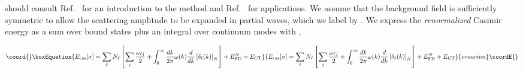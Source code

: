 \documentclass[a4paper,aps,amsfonts,prl,showpacs,nobibnotes,nofootinbib,%
tightenlines,twocolumn]{revtex4}
\providecommand{\vek}[1]{\mathbf{#1}}
\begin{document}
should consult Ref.~\cite{GJW} for an introduction to the method and
Ref.~\cite{us} for applications.  We assume that the background field
\myHighlight{$\sigma(\vek x)$}\coordHE{} is sufficiently symmetric to allow the scattering
amplitude to be expanded in partial waves, which we label by \myHighlight{$\ell$}\coordHE{}. 
We express the \emph{renormalized} Casimir energy as a sum over bound
states \coordHE{} plus an integral over continuum modes with \coordHE{},
%
\begin{widetext}\vspace*{-\bigskipamount}
\begin{equation}\coord{}\boxEquation{
E_{\rm cas}[\sigma]=\sum_\ell N_\ell\left[\sum_j
\frac{\omega_{\ell j}}{2} + \int_0^\infty \frac{dk}{2\pi}
\omega(k)\frac{d}{dk}\left[\delta_\ell(k)\right]_{N}\right]
+ E_{\rm FD}^{N} + E_{\rm CT}
\label{evac1}
}{
E_{\rm cas}[\sigma]=\sum_\ell N_\ell\left[\sum_j
\frac{\omega_{\ell j}}{2} + \int_0^\infty \frac{dk}{2\pi}
\omega(k)\frac{d}{dk}\left[\delta_\ell(k)\right]_{N}\right]
+ E_{\rm FD}^{N} + E_{\rm CT}
}{ecuacion}\coordE{}\end{equation}
\end{widetext}
\end{document}

